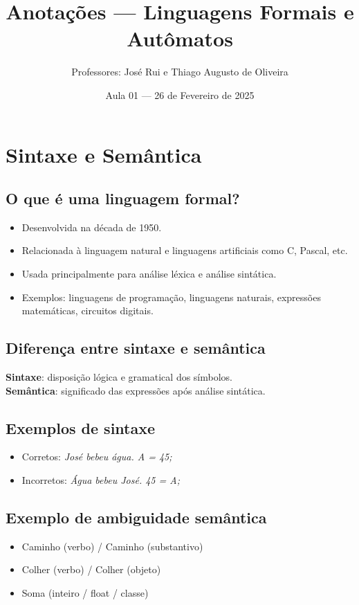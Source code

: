 \documentclass[12pt]{article}
\title{Anotações — Linguagens Formais e Autômatos}
\author{Professores: José Rui e Thiago Augusto de Oliveira}
\date{Aula 01 — 26 de Fevereiro de 2025}
\begin{document}
\maketitle

\section*{Sintaxe e Semântica}

\subsection*{O que é uma linguagem formal?}
\begin{itemize}
  \item Desenvolvida na década de 1950.
  \item Relacionada à linguagem natural e linguagens artificiais como C, Pascal, etc.
  \item Usada principalmente para análise léxica e análise sintática.
  \item Exemplos: linguagens de programação, linguagens naturais, expressões matemáticas, circuitos digitais.
\end{itemize}

\subsection*{Diferença entre sintaxe e semântica}
\textbf{Sintaxe}: disposição lógica e gramatical dos símbolos. \\
\textbf{Semântica}: significado das expressões após análise sintática.

\subsection*{Exemplos de sintaxe}
\begin{itemize}
  \item Corretos: \textit{José bebeu água. A = 45;}
  \item Incorretos: \textit{Água bebeu José. 45 = A;}
\end{itemize}

\subsection*{Exemplo de ambiguidade semântica}
\begin{itemize}
  \item Caminho (verbo) / Caminho (substantivo)
  \item Colher (verbo) / Colher (objeto)
  \item Soma (inteiro / float / classe)
\end{itemize}
\end{document}
